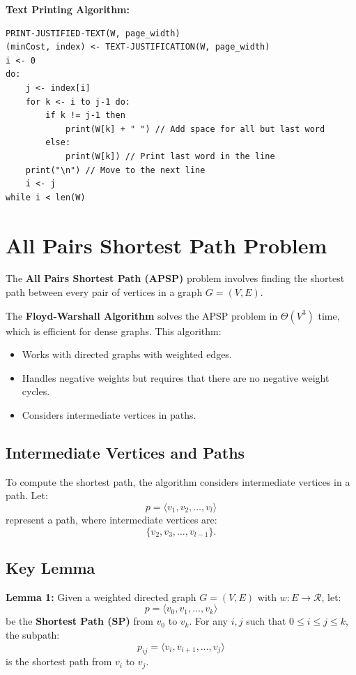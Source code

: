 \textbf{Text Printing Algorithm:}
\begin{verbatim}
PRINT-JUSTIFIED-TEXT(W, page_width)
(minCost, index) <- TEXT-JUSTIFICATION(W, page_width)
i <- 0
do:
    j <- index[i]
    for k <- i to j-1 do:
        if k != j-1 then
            print(W[k] + " ") // Add space for all but last word
        else:
            print(W[k]) // Print last word in the line
    print("\n") // Move to the next line
    i <- j
while i < len(W)
\end{verbatim}

\section{All Pairs Shortest Path Problem}
The \textbf{All Pairs Shortest Path (APSP)} problem involves finding the shortest path between every pair of vertices in a graph \( G = (V, E) \). 

The \textbf{Floyd-Warshall Algorithm} solves the APSP problem in \( \Theta(V^3) \) time, which is efficient for dense graphs. This algorithm:
\begin{itemize}
    \item Works with directed graphs with weighted edges.
    \item Handles negative weights but requires that there are no negative weight cycles.
    \item Considers intermediate vertices in paths.
\end{itemize}

\subsection{Intermediate Vertices and Paths}
To compute the shortest path, the algorithm considers intermediate vertices in a path. Let:
\[
p = \langle v_1, v_2, \dots, v_l \rangle
\]
represent a path, where intermediate vertices are:
\[
\{v_2, v_3, \dots, v_{l-1}\}.
\]

\subsection{Key Lemma}
\textbf{Lemma 1:}  
Given a weighted directed graph \( G = (V, E) \) with \( w: E \to \mathcal{R} \), let:
\[
p = \langle v_0, v_1, \dots, v_k \rangle
\]
be the \textbf{Shortest Path (SP)} from \( v_0 \) to \( v_k \). For any \( i, j \) such that \( 0 \leq i \leq j \leq k \), the subpath:
\[
p_{ij} = \langle v_i, v_{i+1}, \dots, v_j \rangle
\]
is the shortest path from \( v_i \) to \( v_j \).

